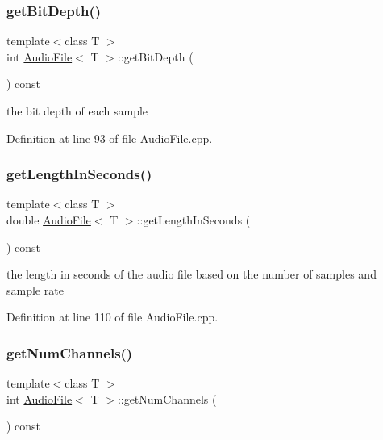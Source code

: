 \subsubsection{\texorpdfstring{get\+Bit\+Depth()}{getBitDepth()}}
{\footnotesize\ttfamily template$<$class T $>$ \\
int \hyperlink{classAudioFile}{Audio\+File}$<$ T $>$\+::get\+Bit\+Depth (\begin{DoxyParamCaption}{ }\end{DoxyParamCaption}) const}

the bit depth of each sample 

Definition at line 93 of file Audio\+File.\+cpp.

\mbox{\label{classAudioFile_a5a6b01404675361b1c21c9c5fb5753d4}} 
\subsubsection{\texorpdfstring{get\+Length\+In\+Seconds()}{getLengthInSeconds()}}
{\footnotesize\ttfamily template$<$class T $>$ \\
double \hyperlink{classAudioFile}{Audio\+File}$<$ T $>$\+::get\+Length\+In\+Seconds (\begin{DoxyParamCaption}{ }\end{DoxyParamCaption}) const}

the length in seconds of the audio file based on the number of samples and sample rate 

Definition at line 110 of file Audio\+File.\+cpp.

\mbox{\label{classAudioFile_a514f860a956b4494ee8d8c806391d6b3}} 
\subsubsection{\texorpdfstring{get\+Num\+Channels()}{getNumChannels()}}
{\footnotesize\ttfamily template$<$class T $>$ \\
int \hyperlink{classAudioFile}{Audio\+File}$<$ T $>$\+::get\+Num\+Channels (\begin{DoxyParamCaption}{ }\end{DoxyParamCaption}) const}

